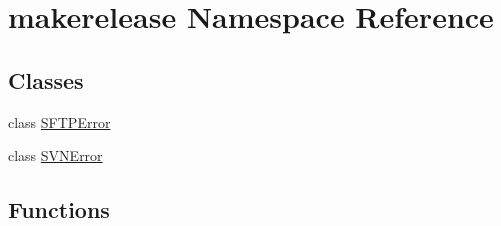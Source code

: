 \hypertarget{namespacemakerelease}{\section{makerelease Namespace Reference}
\label{namespacemakerelease}
}
\subsection*{Classes}
\begin{DoxyCompactItemize}
\item 
class \hyperlink{classmakerelease_1_1_s_f_t_p_error}{S\+F\+T\+P\+Error}
\item 
class \hyperlink{classmakerelease_1_1_s_v_n_error}{S\+V\+N\+Error}
\end{DoxyCompactItemize}
\subsection*{Functions}
